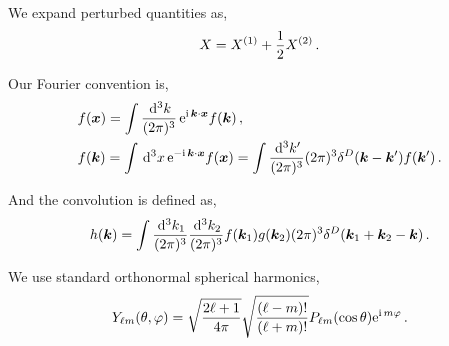 We expand perturbed quantities as,
\begin{equation*}
	X = X^{(1)} + \frac{1}{2} X^{(2)}\,.
\end{equation*}

Our Fourier convention is, 
\begin{align*}
	&f(\bm {x}) = \int \frac{\,\mathrm{d}^3 k}{(2\pi)^3}\, \mathrm{e}^{\mathrm{i\,} \bm {k} \cdot \bm {x}} f(\bm {k})\,,\\
	&f(\bm {k}) = \int \,\mathrm{d}^3x\, \mathrm{e}^{- \mathrm{i\,} \bm {k}\cdot\bm {x}} f(\bm {x}) = \int \frac{\,\mathrm{d}^3 k'}{(2\pi)^3} (2\pi)^3 \delta^D(\bm {k}-\bm {k}') f(\bm {k}')\,.
\end{align*}

And the convolution is defined as, 
\begin{equation*}
	h(\bm {k}) = \int \frac{\,\mathrm{d}^3k_1}{(2\pi)^3} \frac{\,\mathrm{d}^3k_2}{(2\pi)^3} f(\bm {k}_1) g(\bm {k}_2) (2\pi)^3 \delta^D(\bm {k}_1 +\bm {k}_2 - \bm {k})\,.
\end{equation*}

We use standard orthonormal spherical harmonics,
\begin{equation*}
	Y_{\ell m}(\theta,\varphi) = \sqrt{\frac{2 \ell + 1}{4 \pi}} \sqrt{\frac{(\ell - m)!}{(\ell + m)!}} P_{\ell m}(\cos \theta) \mathrm{e}^{\mathrm{i\,} m \varphi}\,.
\end{equation*}






